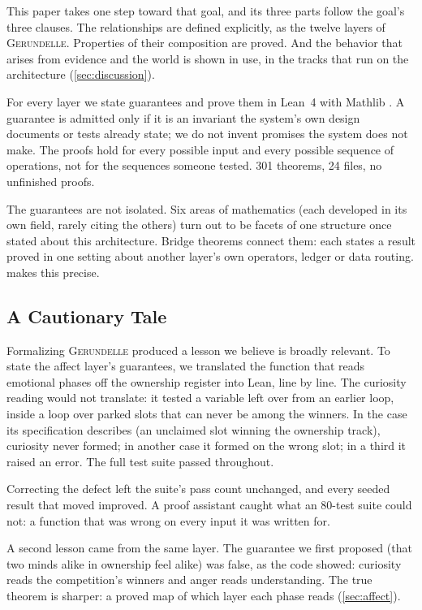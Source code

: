 \documentclass[11pt]{article}
\newcommand{\gerundelle}{\textsc{Gerundelle}}
\theoremstyle{remark}
\begin{document}
This paper takes one step toward that goal, and its three parts follow the goal's three
clauses. The relationships are defined explicitly, as the twelve layers of \gerundelle{}.
Properties of their composition are proved. And the behavior that arises from evidence and
the world is shown in use, in the tracks that run on the architecture
(\cref{sec:discussion}).

For every layer we state guarantees and prove them in Lean~4 \citep{deMouraUllrich2021}
with Mathlib \citep{MathlibCommunity2020}. A guarantee is admitted only if it is an
invariant the system's own design documents or tests already state; we do not invent
promises the system does not make. The proofs hold for every possible input and every
possible sequence of operations, not for the sequences someone tested. 301 theorems, 24
files, no unfinished proofs.

The guarantees are not isolated. Six areas of mathematics (each developed in its own
field, rarely citing the others) turn out to be facets of one structure once stated about
this architecture. Bridge theorems connect them: each states a result proved in one setting
about another layer's own operators, ledger or data routing.  makes
this precise.

\subsection{A Cautionary Tale}

Formalizing \gerundelle{} produced a lesson we believe is broadly relevant. To state the
affect layer's guarantees, we translated the function that reads emotional phases off the
ownership register into Lean, line by line. The curiosity reading would not translate: it
tested a variable left over from an earlier loop, inside a loop over parked slots that can
never be among the winners. In the case its specification describes (an unclaimed slot
winning the ownership track), curiosity never formed; in another case it formed on the
wrong slot; in a third it raised an error. The full test suite passed throughout.

Correcting the defect left the suite's pass count unchanged, and every seeded result that
moved improved. A proof assistant caught what an 80-test suite could not: a function that
was wrong on every input it was written for.

A second lesson came from the same layer. The guarantee we first proposed (that two minds
alike in ownership feel alike) was false, as the code showed: curiosity reads the
competition's winners and anger reads understanding. The true theorem is sharper: a proved
map of which layer each phase reads (\cref{sec:affect}).
\end{document}
